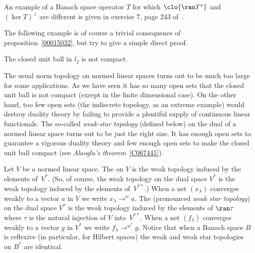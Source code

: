 \begin{exam} An example of a Banach space operator $T$ for which $\clo{\ran T^*}$ and $(\ker T)^\perp$ are different
is given in exercise 7, page 243 of~\cite{BrownP:1970}.
\end{exam}

The following example is of course a trivial consequence of proposition~\ref{00015032}, but try to give a simple
direct proof.

\begin{exam}\label{X_l2ball_not_cpt} The closed unit ball in $l_2$ is not compact.
\end{exam}

The usual norm topology on normed linear spaces turns out to be much too large for some applications.  As we have seen
it has so many open sets that the closed unit ball is not compact (except in the finite dimensional case). On the
other hand, too few open sets (the indiscrete topology, as an extreme example) would destroy duality theory by failing
to provide a plentiful supply of continuous linear functionals.  The so-called \emph{weak-star topology} (defined
below) on the dual of a normed linear space turns out to be just the right size.  It has enough open sets to guarantee
a vigorous duality theory and few enough open sets to make the closed unit ball compact
(see \emph{Alaoglu's theorem}~\ref{C067441}).

\begin{defn}\label{C067434} Let $V$ be a normed linear space. The
 on $V$ is the weak topology induced by the elements of~$V^*$. (So, of
course, the weak topology on the dual space $V^*$ is the weak topology induced by the
elements of~$V^{**}$.) When a net $(x_\lambda)$ converges weakly to a vector $a$ in $V$
we write
$x_\lambda \to^w a$. The
 (pronounced \emph{weak star topology}) on the dual space $V^*$ is the
weak topology induced by the elements of $\ran \tau$ where $\tau$ is the natural
injection of $V$ into~$V^{**}$.  When a net $(f_\lambda)$ converges weakly to a vector $g$
in $V^*$ we write
$f_\lambda \to^{w^*} g$. Notice that when a Banach space $B$ is reflexive (in particular, for Hilbert
spaces) the weak and weak star topologies on $B^*$ are identical.
\end{defn}

